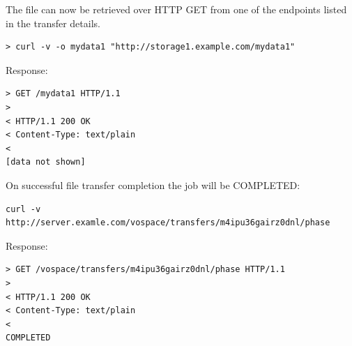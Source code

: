 \documentclass[11pt,a4paper]{ivoa}
\begin{document}
The file can now be retrieved over HTTP GET from one of the endpoints listed in the transfer details.
\begin{lstlisting}
> curl -v -o mydata1 "http://storage1.example.com/mydata1"
\end{lstlisting}
Response:
\begin{lstlisting}
> GET /mydata1 HTTP/1.1
>
< HTTP/1.1 200 OK
< Content-Type: text/plain
<
[data not shown]
\end{lstlisting}
On successful file transfer completion the job will be COMPLETED:
\begin{lstlisting}
curl -v http://server.examle.com/vospace/transfers/m4ipu36gairz0dnl/phase
\end{lstlisting}
Response:
\begin{lstlisting}
> GET /vospace/transfers/m4ipu36gairz0dnl/phase HTTP/1.1
>
< HTTP/1.1 200 OK
< Content-Type: text/plain
<
COMPLETED
\end{lstlisting}
\end{document}
